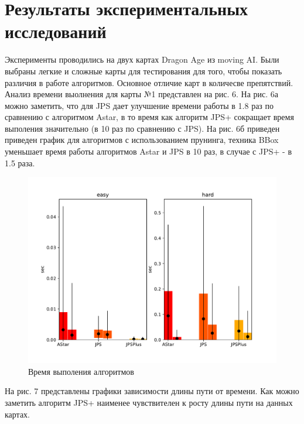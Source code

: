 \documentclass{physlab}
\begin{document}
\section{Результаты экспериментальных исследований}
Эксперименты проводились на двух картах Dragon Age из moving AI. Были выбраны легкие и сложные карты для тестирования для того, чтобы показать различия в работе алгоритмов. Основное отличие карт в количесве препятствий. Анализ времени выолнения для карты №1 представлен на рис. 6. На рис. 6а можно заметить, что для JPS дает улучшение времени работы в 1.8 раз по сравнению с алгоритмом Astar, в то время как алгоритм JPS+ сокращает время выполения значительно (в 10 раз по сравнению с JPS). На рис. 6б приведен приведен график для алгоритмов  с использованием прунинга, техника BBox уменьшает время работы алгоритмов Astar и JPS в 10 раз, в случае с JPS+ - в 1.5 раза.  
\begin{figure}[H]
	\includegraphics[width=0.93\linewidth]{error.pdf}
\caption{Время выполения алгоритмов }
\end{figure} 
На рис. 7 представлены графики зависимости длины пути от времени. Как можно заметить алгоритм JPS+ наименее чувствителен к росту длины пути на данных картах. 
\end{document}
